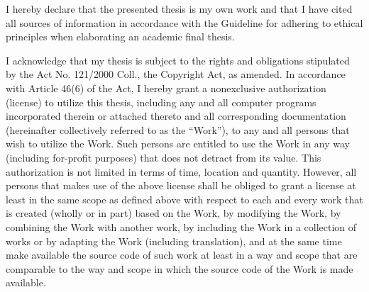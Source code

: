 \documentclass[english,master,unicode,bw]{ctufit-thesis}
\begin{document}
\begin{declarationpage}
I hereby declare that the presented thesis is my own work and that I have cited all
sources of information in accordance with the Guideline for adhering to ethical
principles when elaborating an academic final thesis.

I acknowledge that my thesis is subject to the rights and obligations stipulated by the
Act No. 121/2000 Coll., the Copyright Act, as amended. In accordance with Article 46(6)
of the Act, I hereby grant a nonexclusive authorization (license) to utilize this thesis,
including any and all computer programs incorporated therein or attached thereto and
all corresponding documentation (hereinafter collectively referred to as the “Work”), to
any and all persons that wish to utilize the Work. Such persons are entitled to use the
Work in any way (including for-profit purposes) that does not detract from its value.
This authorization is not limited in terms of time, location and quantity. However, all
persons that makes use of the above license shall be obliged to grant a license at least
in the same scope as defined above with respect to each and every work that is created
(wholly or in part) based on the Work, by modifying the Work, by combining the Work
with another work, by including the Work in a collection of works or by adapting the
Work (including translation), and at the same time make available the source code of
such work at least in a way and scope that are comparable to the way and scope in
which the source code of the Work is made available.
\end{declarationpage}

\printabstractpage %


\mainmatter\mainmatterinit %









\appendix\appendixinit %


\backmatter %

\printbibliography %

\end{document}
